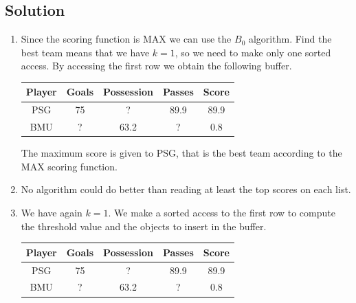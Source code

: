 \documentclass[12pt, a4paper]{report}
\begin{document}
    \subsection*{Solution}
        \begin{enumerate}
            \item Since the scoring function is MAX we can use the $B_0$ algorithm. Find the best team means that we have $k=1$, so we 
                need to make only one sorted access. By accessing the first row we obtain the following buffer. 
                \begin{table}[H]
                    \centering
                    \begin{tabular}{c|ccc|c}
                    \hline
                    \textbf{Player} & \textbf{Goals} & \textbf{Possession} & \textbf{Passes} & \textbf{Score} \\ \hline
                    PSG             & 75             & ?                   & 89.9            & 89.9           \\
                    BMU             & ?              & 63.2                & ?               & 0.8            \\ \hline
                    \end{tabular}
                \end{table}
                The maximum score is given to PSG, that is the best team according to the MAX scoring function. 
            \item No algorithm could do better than reading at least the top scores on each list. 
            \item We have again $k=1$. We make a sorted access to the first row to compute the threshold value and 
                the objects to insert in the buffer. 
                \begin{table}[H]
                    \centering
                    \begin{tabular}{c|ccc|c}
                    \hline
                    \textbf{Player} & \textbf{Goals} & \textbf{Possession} & \textbf{Passes} & \textbf{Score} \\ \hline
                    PSG             & 75             & ?                   & 89.9            & 89.9           \\
                    BMU             & ?              & 63.2                & ?               & 0.8            \\ \hline
                    \end{tabular}
                \end{table}

\end{enumerate}
\end{document}
